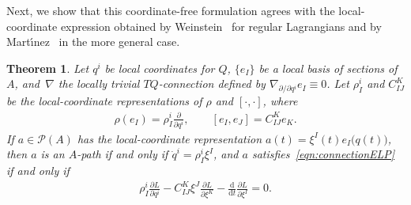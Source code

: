 \documentclass[10pt,a4paper]{amsart}
\numberwithin{equation}{section}
\newtheorem{Theorem}{Theorem}[section]
\begin{document}
Next, we show that this coordinate-free formulation agrees with the local-coordinate expression obtained by Weinstein~\cite{Weinstein1996} for regular Lagrangians and by Mart\'{\i}nez~\cite{Martinez2001,Martinez2007,Martinez2008} in the more general case.

\begin{Theorem} \label{thm:coordinateELP} Let $ q ^i $ be local coordinates for $Q$, $ \{ e _I \} $ be a local basis of sections of~$A$, and~$ \nabla $ the locally trivial $ T Q $-connection defined by $ \nabla _{ \partial / \partial q ^i } e _I \equiv 0 $. Let $ \rho ^i _I $ and $ C _{ I J } ^K $ be the local-coordinate representations of $ \rho $ and $ [\cdot , \cdot ] $, where
 \begin{gather*}
 \rho ( e _I ) = \rho ^i _I \frac{ \partial }{ \partial q ^i } , \qquad [ e _I , e _J ] = C _{ I J } ^K e _K .
 \end{gather*}
If $ a \in \mathcal{P} (A) $ has the local-coordinate representation $ a (t) = \xi ^I (t) e _I \bigl( q (t) \bigr) $, then $a$ is an $A$-path if and only if $ \dot{q} ^i = \rho ^i _I \xi ^I $, and $a$ satisfies~\eqref{eqn:connectionELP} if and only if
 \begin{gather} \label{eqn:coordinatesELP}
 \rho ^i _I \frac{ \partial L }{ \partial q ^i } - C ^K _{ I J } \xi ^J \frac{ \partial L }{ \partial \xi ^K } - \frac{\mathrm{d}}{\mathrm{d}t} \frac{ \partial L }{ \partial \xi ^I } = 0 .
 \end{gather}
\end{Theorem}
\end{document}
